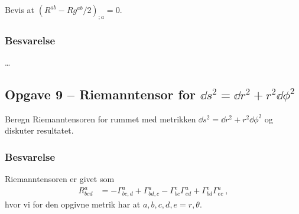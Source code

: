 \documentclass[../main.tex]{subfiles}
\begin{document}
Bevis at $(R^{ab} - Rg^{ab}/2)_{;a} = 0$.


\subsubsection{Besvarelse}

\ldots




\subsection{Opgave 9 -- Riemanntensor for $\dd s^2 = \dd r^2 + r^2 \dd \phi^2$}
\setcounter{subsection}{9}
\setcounter{equation}{0}

Beregn Riemanntensoren for rummet med metrikken $\dd s^2 = \dd r^2 + r^2 \dd \phi^2$ og diskuter resultatet.


\subsubsection{Besvarelse}

Riemanntensoren er givet som
\begin{align}
    R^a_{bcd} &= - \Gamma^a_{bc,d} + \Gamma^a_{bd,c} - \Gamma^e_{bc} \Gamma^a_{ed} + \Gamma^e_{bd} \Gamma^a_{ec} \: ,
\end{align}
hvor vi for den opgivne metrik har at $a,b,c,d,e=r,\theta$.
\end{document}
